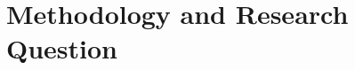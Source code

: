 % 
% 
% 
% 
% 
% 

\section{Methodology and Research Question}\label{sec:Methodology and Research Question} %

